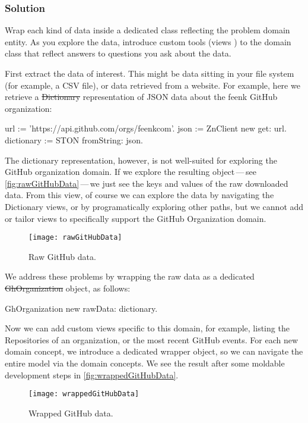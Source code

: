\documentclass[sigconf]{acmart}
\begin{document}
\subsubsection*{Solution}
Wrap each kind of data inside a dedicated class reflecting the problem domain entity.
As you explore the data, introduce custom tools (views \etc) to the domain class that reflect answers to questions you ask about the data.

First extract the data of interest.
This might be data sitting in your file system (for example, a CSV file), or data retrieved from a website.
For example, here we retrieve a \st{Dictionary} representation of JSON data about the feenk GitHub organization:

\begin{code}
url := 'https://api.github.com/orgs/feenkcom'.
json := ZnClient new get: url.
dictionary := STON fromString: json.
\end{code}

The dictionary representation, however, is not well-suited for exploring the GitHub organization domain.
If we explore the resulting object\,---\,see \autoref{fig:rawGitHubData}\,---\,we just see the keys and values of the raw downloaded data.
From this view, of course we can explore the data by navigating the Dictionary views, or by programatically exploring other paths, but we cannot add or tailor views to specifically support the GitHub Organization domain.

\begin{figure}[h]
  \texttt{[image: rawGitHubData]}
  \caption{Raw GitHub data.}
  \label{fig:rawGitHubData}
\end{figure}

We address these problems by wrapping the raw data as a dedicated \st{GhOrganization} object, as follows:

\begin{code}
GhOrganization new rawData: dictionary.
\end{code}

Now we can add custom views specific to this domain, for example, listing the Repositories of an organization, or the most recent GitHub events.
For each new domain concept, we introduce a dedicated wrapper object, so we can navigate the entire model via the domain concepts.
We see the result after some moldable development steps in \autoref{fig:wrappedGitHubData}.

\begin{figure}[h]
  \texttt{[image: wrappedGitHubData]}
  \caption{Wrapped GitHub data.}
  \label{fig:wrappedGitHubData}
\end{figure}
\end{document}
